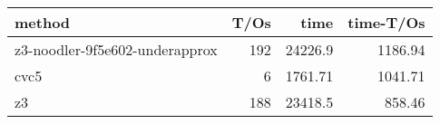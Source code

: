 \begin{tabular}{lrrr}
\hline
 method                         &   T/Os &     time &   time-T/Os \\
\hline
 z3-noodler-9f5e602-underapprox &    192 & 24226.9  &     1186.94 \\
 cvc5                           &      6 &  1761.71 &     1041.71 \\
 z3                             &    188 & 23418.5  &      858.46 \\
\hline
\end{tabular}
